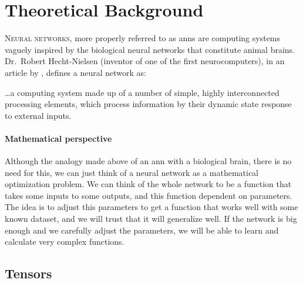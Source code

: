 

\chapter{Theoretical Background}\label{cha:theory}



\lettrine{N}{eural networks}, more properly referred to
as \glspl{ann} are computing systems vaguely inspired by the biological neural
networks that constitute animal brains. Dr.\ Robert Hecht-Nielsen (inventor of
one of the first neurocomputers), in an article by
, defines a neural network as:

\begin{quoteBox}
  \ldots a computing system made up of a number of simple, highly
  interconnected processing elements, which process information by their
  dynamic state response to external inputs.
  \tcblower{}
\end{quoteBox}

\subsubsection{Mathematical perspective}

Although the analogy made above of an \gls{ann} with a biological brain, there
is no need for this, we can just think of a neural network as a mathematical
optimization problem. We can think of the whole network to be a function that
takes some inputs to some outputs, and this function dependent on
parameters. The idea is to adjust this parameters to get a function that works
well with some known dataset, and we will trust that it will generalize
well. If the network is big enough and we carefully adjust the parameters, we
will be able to learn and calculate very complex functions.



\section{Tensors}


